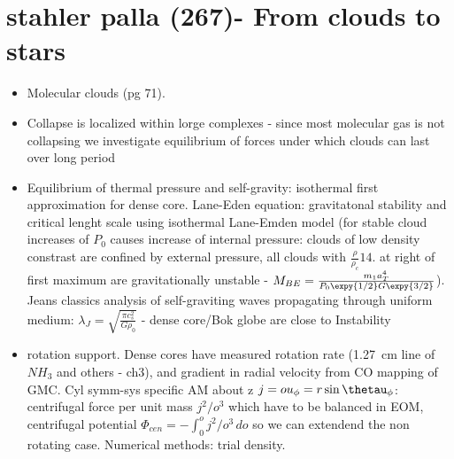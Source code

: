 \chapter{stahler palla (267)- From clouds to stars}

\begin{itemize}
\item Molecular clouds (pg 71). 
\item Collapse is localized within lorge complexes - since most molecular gas is not collapsing we investigate equilibrium of forces under which clouds can last over long period
\item Equilibrium of thermal pressure and self-gravity: isothermal first approximation for dense core. Lane-Eden equation: gravitatonal stability and critical lenght scale using isothermal Lane-Emden model (for stable cloud increases of $P_0$ causes increase of internal pressure: clouds of low density constrast are confined by external pressure, all clouds with $\frac{\rho}{\rho_c}14.$ at right of first maximum are gravitationally unstable - $M_{BE}=\frac{m_1a_T^4}{P_0\expy{1/2}G\expy{3/2}}$). Jeans classics analysis of self-graviting waves propagating through uniform medium: $\lambda_J=\sqrt{\frac{\pi c_s^2}{G\rho_0}}$ - dense core/Bok globe are close to Instability
\item rotation support. Dense cores have measured rotation rate (\SI{1.27}{\cm} line of $NH_3$ and others - ch3), and gradient in radial velocity from CO mapping of GMC. Cyl symm-sys specific AM about z $j=ou_{\phi}=r\sin\thetau_{\phi}$: centrifugal force per unit mass $j^2/o^3$ which have to be balanced in EOM, centrifugal potential $\Phi_{cen}=-\int_0^oj^2/o^3\,do$ so we can extendend the non rotating case. Numerical methods: trial density. 
\end{itemize}
